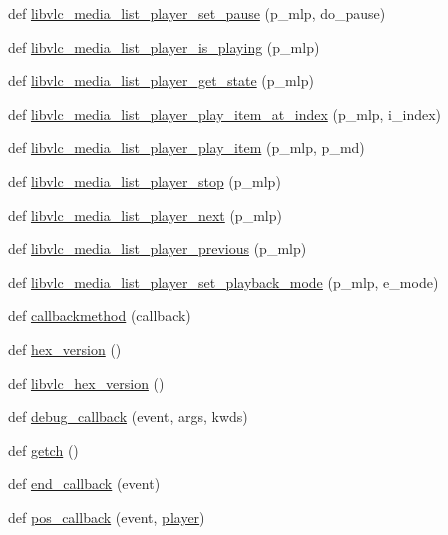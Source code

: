 \begin{DoxyCompactItemize}
\item 
def \hyperlink{namespacevlc_ab9597e2c2fd5fb8a8ea9f1c259796605}{libvlc\+\_\+media\+\_\+list\+\_\+player\+\_\+set\+\_\+pause} (p\+\_\+mlp, do\+\_\+pause)
\item 
def \hyperlink{namespacevlc_a0c4e9ab9a5ffb361e99a2d4f61386e4c}{libvlc\+\_\+media\+\_\+list\+\_\+player\+\_\+is\+\_\+playing} (p\+\_\+mlp)
\item 
def \hyperlink{namespacevlc_a763990d86ad08b9968f1f4263d634f26}{libvlc\+\_\+media\+\_\+list\+\_\+player\+\_\+get\+\_\+state} (p\+\_\+mlp)
\item 
def \hyperlink{namespacevlc_a460c1773285fe9fed9795e86e8039c0d}{libvlc\+\_\+media\+\_\+list\+\_\+player\+\_\+play\+\_\+item\+\_\+at\+\_\+index} (p\+\_\+mlp, i\+\_\+index)
\item 
def \hyperlink{namespacevlc_a222147643807a3c36fe41538526528d9}{libvlc\+\_\+media\+\_\+list\+\_\+player\+\_\+play\+\_\+item} (p\+\_\+mlp, p\+\_\+md)
\item 
def \hyperlink{namespacevlc_afdd34bfadc2c26d87c721ac0c71089d7}{libvlc\+\_\+media\+\_\+list\+\_\+player\+\_\+stop} (p\+\_\+mlp)
\item 
def \hyperlink{namespacevlc_ad7b227a78e34e99300dfa0d794b906cb}{libvlc\+\_\+media\+\_\+list\+\_\+player\+\_\+next} (p\+\_\+mlp)
\item 
def \hyperlink{namespacevlc_a528f3b4e34c0d8591691fb2f4aaf2aff}{libvlc\+\_\+media\+\_\+list\+\_\+player\+\_\+previous} (p\+\_\+mlp)
\item 
def \hyperlink{namespacevlc_a31fd24c2a75a7af7b6f1d19de6b66e21}{libvlc\+\_\+media\+\_\+list\+\_\+player\+\_\+set\+\_\+playback\+\_\+mode} (p\+\_\+mlp, e\+\_\+mode)
\item 
def \hyperlink{namespacevlc_aaddf7ebb083eb66131f099136cf6f583}{callbackmethod} (callback)
\item 
def \hyperlink{namespacevlc_a24d18f95ac8282ca98ec1740f7f6b7cc}{hex\+\_\+version} ()
\item 
def \hyperlink{namespacevlc_a53e26e809dfb7c1f1a1f25d5e0530472}{libvlc\+\_\+hex\+\_\+version} ()
\item 
def \hyperlink{namespacevlc_a14ed115618edb9fde8ca534d70c5e283}{debug\+\_\+callback} (event, args, kwds)
\item 
def \hyperlink{namespacevlc_a26c66231b8919b9ec0736a57bab415b9}{getch} ()
\item 
def \hyperlink{namespacevlc_a93ea3b472864341c8419502bd4c6a1a7}{end\+\_\+callback} (event)
\item 
def \hyperlink{namespacevlc_a78c9205b41c98f83d6b893ec6857ed05}{pos\+\_\+callback} (event, \hyperlink{namespacevlc_a46afbb77ee4b53026dff7b4f65384dc4}{player})

\end{DoxyCompactItemize}
